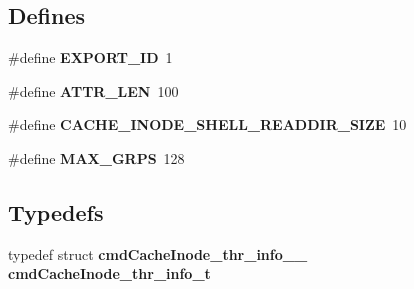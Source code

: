 \subsection*{Defines}
\begin{DoxyCompactItemize}
\item 
\#define {\bf EXPORT\_\-ID}~1
\item 
\#define {\bf ATTR\_\-LEN}~100
\item 
\#define {\bf CACHE\_\-INODE\_\-SHELL\_\-READDIR\_\-SIZE}~10
\item 
\#define {\bf MAX\_\-GRPS}~128
\end{DoxyCompactItemize}
\subsection*{Typedefs}
\begin{DoxyCompactItemize}
\item 
typedef struct {\bf cmdCacheInode\_\-thr\_\-info\_\-\_\-} {\bf cmdCacheInode\_\-thr\_\-info\_\-t}
\end{DoxyCompactItemize}
